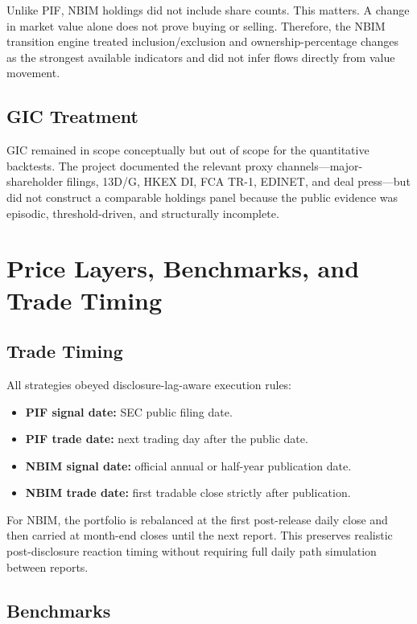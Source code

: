 \documentclass[conference]{IEEEtran}
\begin{document}
Unlike PIF, NBIM holdings did not include share counts. This matters. A change in market value alone does not prove buying or selling. Therefore, the NBIM transition engine treated inclusion/exclusion and ownership-percentage changes as the strongest available indicators and did not infer flows directly from value movement.

\subsection{GIC Treatment}

GIC remained in scope conceptually but out of scope for the quantitative backtests. The project documented the relevant proxy channels---major-shareholder filings, 13D/G, HKEX DI, FCA TR-1, EDINET, and deal press---but did not construct a comparable holdings panel because the public evidence was episodic, threshold-driven, and structurally incomplete.

\section{Price Layers, Benchmarks, and Trade Timing}

\subsection{Trade Timing}

All strategies obeyed disclosure-lag-aware execution rules:
\begin{itemize}[leftmargin=1.4em]
    \item \textbf{PIF signal date:} SEC public filing date.
    \item \textbf{PIF trade date:} next trading day after the public date.
    \item \textbf{NBIM signal date:} official annual or half-year publication date.
    \item \textbf{NBIM trade date:} first tradable close strictly after publication.
\end{itemize}

For NBIM, the portfolio is rebalanced at the first post-release daily close and then carried at month-end closes until the next report. This preserves realistic post-disclosure reaction timing without requiring full daily path simulation between reports.

\subsection{Benchmarks}
\end{document}
